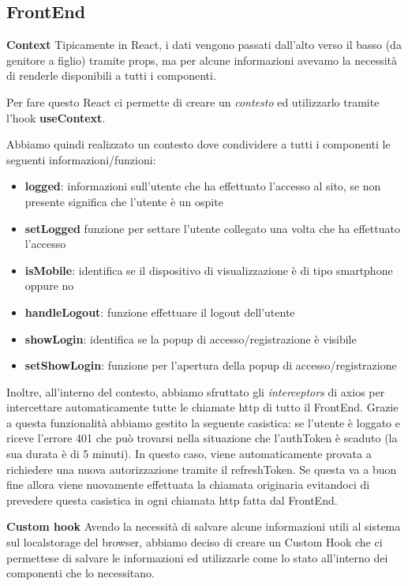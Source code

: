 \clearpage

\subsection{FrontEnd}

\bigbreak
\noindent
\textbf{Context}
\bigbreak
\noindent
Tipicamente in React, i dati vengono passati dall'alto verso il basso (da genitore a figlio) tramite props, 
ma per alcune informazioni avevamo la necessità di renderle disponibili a tutti i componenti.

Per fare questo React ci permette di creare un \textit{contesto} ed utilizzarlo tramite l'hook \textbf{useContext}.

Abbiamo quindi realizzato un contesto dove condividere a tutti i componenti le seguenti informazioni/funzioni:
\begin{itemize}
	\item \textbf{logged}: informazioni sull'utente che ha effettuato l'accesso al sito, se non presente significa che l'utente è un ospite
	\item \textbf{setLogged} funzione per settare l'utente collegato una volta che ha effettuato l'accesso
	\item \textbf{isMobile}: identifica se il dispositivo di visualizzazione è di tipo smartphone oppure no
	\item \textbf{handleLogout}: funzione effettuare il logout dell'utente
	\item \textbf{showLogin}: identifica se la popup di accesso/registrazione è visibile
	\item \textbf{setShowLogin}: funzione per l'apertura della popup di accesso/registrazione
\end{itemize}

Inoltre, all'interno del contesto, abbiamo sfruttato gli \textit{interceptors} di axios per intercettare automaticamente tutte le chiamate http di tutto il FrontEnd.
Grazie a questa funzionalità abbiamo gestito la seguente casistica: 
se l'utente è loggato e riceve l'errore 401 che può trovarsi nella situazione che l'authToken è scaduto (la sua durata è di 5 minuti).
In questo caso, viene automaticamente provata a richiedere una nuova autorizzazione tramite il refreshToken.
Se questa va a buon fine allora viene nuovamente effettuata la chiamata originaria evitandoci di prevedere questa casistica in ogni chiamata http fatta dal FrontEnd.

\bigbreak
\noindent
\textbf{Custom hook}
Avendo la necessità di salvare alcune informazioni utili al sistema sul localstorage del browser, 
abbiamo deciso di creare un Custom Hook che ci permettese di salvare le informazioni ed utilizzarle come lo stato all'interno dei componenti che lo necessitano.

